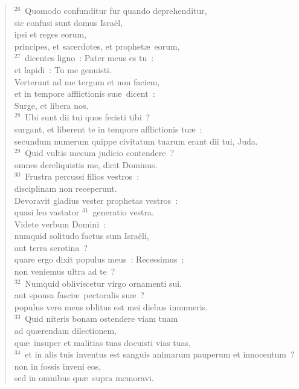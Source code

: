 \begin{verse}${}^{26}$~Quomodo confunditur fur quando deprehenditur,\\ sic confusi sunt domus Isra\"el,\\ ipsi et reges eorum,\\ principes, et sacerdotes, et prophet\ae\ eorum,\\
${}^{27}$~dicentes ligno~: Pater meus es tu~:\\ et lapidi~: Tu me genuisti.\\ Verterunt ad me tergum et non faciem,\\ et in tempore afflictionis su\ae\ dicent~:\\ Surge, et libera nos.\\
${}^{28}$~Ubi sunt dii tui quos fecisti tibi~?\\ surgant, et liberent te in tempore afflictionis tu\ae~:\\ secundum numerum quippe civitatum tuarum erant dii tui, Juda.\\
${}^{29}$~Quid vultis mecum judicio contendere~?\\ omnes dereliquistis me, dicit Dominus.\\
${}^{30}$~Frustra percussi filios vestros~:\\ disciplinam non receperunt.\\ Devoravit gladius vester prophetas vestros~:\\ quasi leo vastator
${}^{31}$~generatio vestra.\\ Videte verbum Domini~:\\ numquid solitudo factus sum Isra\"eli,\\ aut terra serotina~?\\ quare ergo dixit populus meus~: Recessimus~;\\ non veniemus ultra ad te~?\\
${}^{32}$~Numquid obliviscetur virgo ornamenti sui,\\ aut sponsa fasci\ae\ pectoralis su\ae~?\\ populus vero meus oblitus est mei diebus innumeris.\\
${}^{33}$~Quid niteris bonam ostendere viam tuam\\ ad qu\ae rendam dilectionem,\\ qu\ae\ insuper et malitias tuas docuisti vias tuas,\\
${}^{34}$~et in alis tuis inventus est sanguis animarum pauperum et innocentum~?\\ non in fossis inveni eos,\\ sed in omnibus qu\ae\ supra memoravi.\\

\end{verse}

